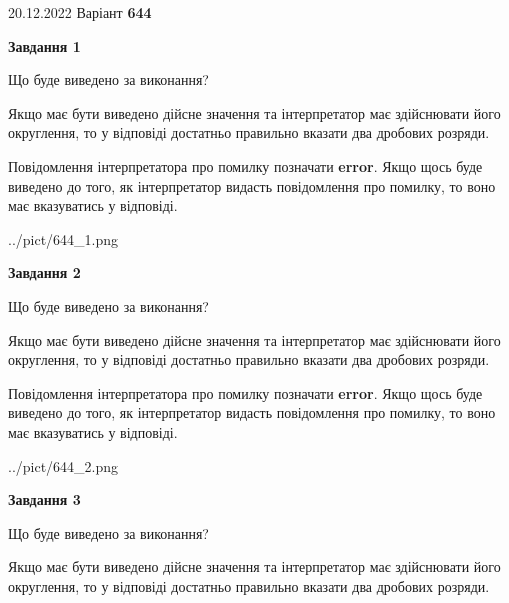 \documentclass[12pt, ukrainian]{article}
\begin{document}
{20.12.2022 Варіант \No \textbf { 644 }\par}
{
\begin {Large}

{\begin {center}\textbf{Завдання 1}\end {center}}\par
Що буде виведено за виконання? \par

Якщо має бути виведено дійсне значення та інтерпретатор має здійснювати його округлення, 
то у відповіді достатньо правильно вказати два дробових розряди.

Повідомлення інтерпретатора про помилку позначати \textbf{error}.
Якщо щось буде виведено до того, як інтерпретатор видасть повідомлення про помилку, 
то воно має вказуватись у відповіді. \par

\begin{center}
	{../pict/644_1.png}
\end{center}
\newpage

{\begin {center}\textbf{Завдання 2}\end {center}}\par
Що буде виведено за виконання? \par

Якщо має бути виведено дійсне значення та інтерпретатор має здійснювати його округлення, 
то у відповіді достатньо правильно вказати два дробових розряди.

Повідомлення інтерпретатора про помилку позначати \textbf{error}.
Якщо щось буде виведено до того, як інтерпретатор видасть повідомлення про помилку, 
то воно має вказуватись у відповіді. \par

\begin{center}
	{../pict/644_2.png}
\end{center}
\newpage

{\begin {center}\textbf{Завдання 3}\end {center}}\par
Що буде виведено за виконання? \par

Якщо має бути виведено дійсне значення та інтерпретатор має здійснювати його округлення, 
то у відповіді достатньо правильно вказати два дробових розряди.


\end{Large}}
\end{document}
